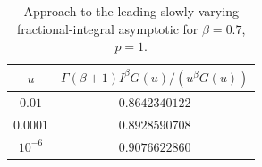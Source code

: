 \begin{table}[htbp]
\centering\small
\caption{Approach to the leading slowly-varying fractional-integral asymptotic for $\beta=0.7$, $p=1$.}
\label{p11:tab:endpoint-ratio}
\begin{tabular}{@{}cc@{}}
\toprule
$u$ & $\Gamma(\beta+1)I^\beta G(u)/(u^\beta G(u))$\\
\midrule
$0.01$ & $0.8642340122$\\
$0.0001$ & $0.8928590708$\\
$10^{-6}$ & $0.9076622860$\\
\bottomrule
\end{tabular}
\end{table}

